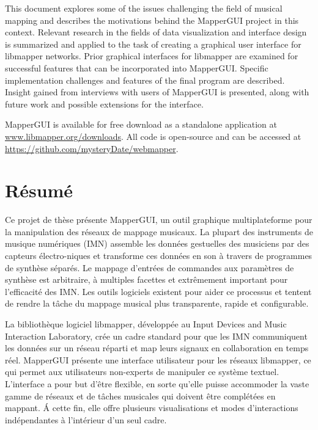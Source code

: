\documentclass [12pt,letterpaper]{report}
\begin{document}
This document explores some of the issues challenging the field of musical mapping and describes the motivations behind the MapperGUI project in this context. Relevant research in the fields of data visualization and interface design is summarized and applied to the task of creating a graphical user interface for libmapper networks. Prior graphical interfaces for libmapper are examined for successful features that can be incorporated into MapperGUI. Specific implementation challenges and features of the final program are described. Insight gained from interviews with users of MapperGUI is presented, along with future work and possible extensions for the interface.

MapperGUI is available for free download as a standalone application at \url{www.libmapper.org/downloads}. All code is open-source and can be accessed at \url{https://github.com/mysteryDate/webmapper}.

\newpage

\section*{\centering R\'esum\'e}

Ce projet de thèse pr\'esente MapperGUI, un outil graphique multiplateforme pour la manipulation des r\'eseaux de mappage musicaux. La plupart des instruments de musique num\'eriques (IMN) assemble les donn\'ees gestuelles des musiciens par des capteurs \'electro-niques et transforme ces donn\'ees en son \`a travers de programmes de synthèse s\'epar\'es. Le mappage d’entr\'ees de commandes aux paramètres de synthèse est arbitraire, \`a multiples facettes et extrêmement important pour l’efficacit\'e des IMN. Les outils logiciels existent pour aider ce processus et tentent de rendre la t\^ache du mappage musical plus transparente, rapide et configurable. 

La bibliothèque logiciel libmapper, d\'evelopp\'ee au Input Devices and Music Interaction Laboratory, cr\'ee un cadre standard pour que les IMN communiquent les donn\'ees sur un r\'eseau r\'eparti et map leurs signaux en collaboration en temps r\'eel. MapperGUI pr\'esente une interface utilisateur pour les r\'eseaux libmapper, ce qui permet aux utilisateurs non-experts de manipuler ce système textuel. L’interface a pour but d’\^etre flexible, en sorte qu’elle puisse accommoder la vaste gamme de r\'eseaux et de t\^aches musicales qui doivent \^etre compl\'et\'ees en mappant. \'A cette fin, elle offre plusieurs visualisations et modes d’interactions ind\'ependantes \`a l’int\'erieur d’un seul cadre.    
\end{document}
